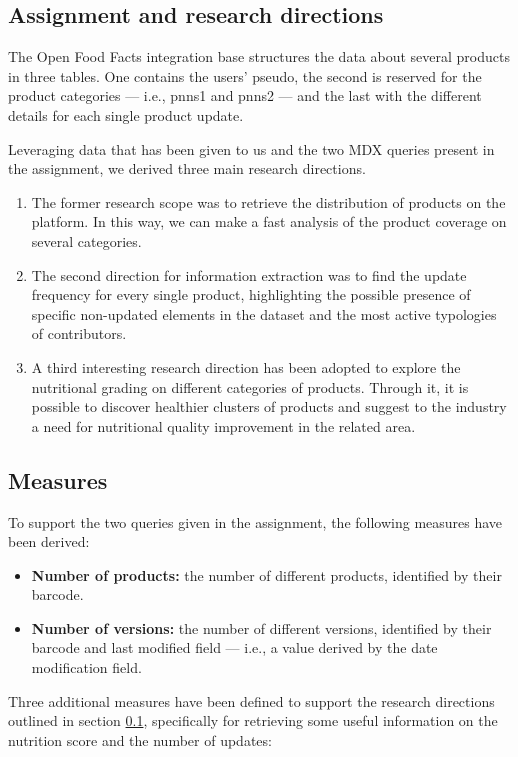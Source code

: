 \documentclass[runningheads]{llncs}
\begin{document}
\subsection{Assignment and research directions}\label{directions}
The Open Food Facts integration base structures the data about several products in three tables. One contains the users’ pseudo, the second is reserved for the product categories — i.e., pnns1 and pnns2 — and the last with the different details for each single product update.

Leveraging data that has been given to us and the two MDX queries present in the assignment, we derived three main research directions.

\begin{enumerate}
  \item The former research scope was to retrieve the distribution of products on the platform. In this way, we can make a fast analysis of the product coverage on several categories.
  \item The second direction for information extraction was to find the update frequency for every single product, highlighting the possible presence of specific non-updated elements in the dataset and the most active typologies of contributors.
  \item A third interesting research direction has been adopted to explore the nutritional grading on different categories of products. Through it, it is possible to discover healthier clusters of products and suggest to the industry a need for nutritional quality improvement in the related area.
\end{enumerate}

\subsection{Measures}
To support the two queries given in the assignment, the following measures have been derived:

\begin{itemize}
    \item \textbf{Number of products:} the number of different products, identified by their barcode.
    \item \textbf{Number of versions:} the number of different versions, identified by their barcode and last modified field — i.e., a value derived by the date modification field.
\end{itemize}

Three additional measures have been defined to support the research directions outlined in section \ref{directions}, specifically for retrieving some useful information on the nutrition score and the number of updates:
\end{document}
